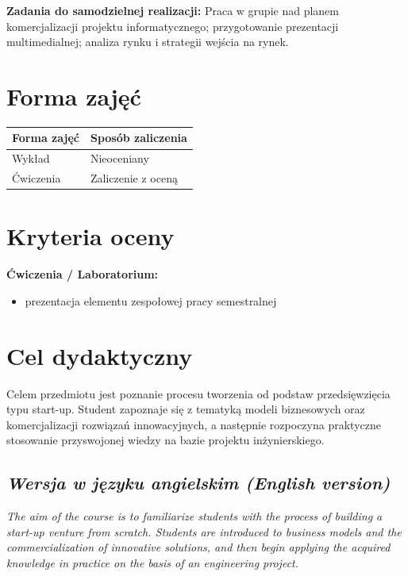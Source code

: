 \documentclass[12pt, a4paper]{article}
\newcommand{\thdrule}{\noalign{\global\setlength{\extrarowheight}{0pt}}}
\newcommand{\thdend}{\noalign{\global\setlength{\extrarowheight}{3pt}}}
\begin{document}
\vspace{4pt}
\noindent\textbf{Zadania do samodzielnej realizacji:} Praca w grupie nad planem komercjalizacji projektu informatycznego; przygotowanie prezentacji multimedialnej; analiza rynku i strategii wejścia na rynek.

\section{Forma zajęć}

\begin{center}
{\scriptsize
\begin{tabular}{m{5cm}m{8cm}}
\thdrule\toprule
\rowcolor{pjatkRed} {\color{white}\textbf{Forma zajęć}} & {\color{white}\textbf{Sposób zaliczenia}} \\
\midrule\thdend
  \rowcolor{tableRowLight} Wykład & Nieoceniany \\
  \rowcolor{tableRowAlt} Ćwiczenia & Zaliczenie z oceną \\
\bottomrule
\end{tabular}}
\end{center}

\section{Kryteria oceny}

\textbf{Ćwiczenia / Laboratorium:}
\begin{itemize}
  \item prezentacja elementu zespołowej pracy semestralnej
\end{itemize}


\section{Cel dydaktyczny}

Celem przedmiotu jest poznanie  procesu tworzenia od podstaw przedsięwzięcia typu start-up. Student zapoznaje się z tematyką modeli biznesowych oraz komercjalizacji rozwiązań innowacyjnych, a następnie rozpoczyna praktyczne stosowanie przyswojonej wiedzy na bazie projektu inżynierskiego.

\subsection*{\textit{Wersja w języku angielskim (English version)}}

\textit{The aim of the course is to familiarize students with the process of building a start-up venture from scratch. Students are introduced to business models and the commercialization of innovative solutions, and then begin applying the acquired knowledge in practice on the basis of an engineering project.}
\end{document}
